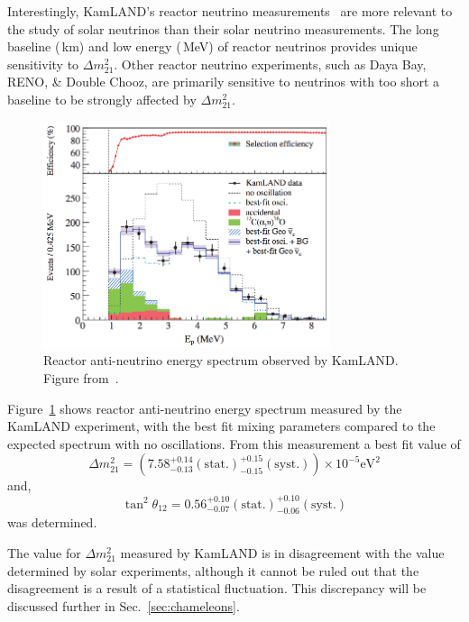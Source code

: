 Interestingly, KamLAND's reactor neutrino measurements~\citep{kamland_reactor} are
more relevant to the study of solar neutrinos than their solar neutrino measurements.
The long baseline (\,km) and low energy (\,MeV) of reactor neutrinos provides
unique sensitivity to $\Delta m^{2}_{21}$.
Other reactor neutrino experiments, such as Daya Bay, RENO, \& Double Chooz,
are primarily sensitive to neutrinos with too short a baseline to be strongly
affected by $\Delta m^{2}_{21}$.

\begin{figure}[htbp]
  \centering
  \includegraphics[width=0.75\textwidth]{kamland_reactor_spectrum}
  \caption[Kamland Reactor Spectrum]{Reactor anti-neutrino energy spectrum observed by KamLAND.
                                    Figure from~\citep{kamland_reactor}.}
  \label{fig:kamland_reactor}
\end{figure}

Figure~\ref{fig:kamland_reactor} shows reactor anti-neutrino energy spectrum measured
by the KamLAND experiment, with the best fit mixing parameters compared to the
expected spectrum with no oscillations.
From this measurement a best fit value of 
\begin{equation*}
    \Delta m^{2}_{21} = (7.58^{+0.14}_{-0.13}(\mathrm{stat.})^{+0.15}_{-0.15}(\mathrm{syst.}) )\times 10^{-5}\text{eV}^{2}
\end{equation*}
and,
\begin{equation*}
\tan^{2} \theta_{12} = 0.56^{+0.10}_{-0.07}(\mathrm{stat.})^{+0.10}_{-0.06}(\mathrm{syst.})
\end{equation*}
was determined.

The value for $\Delta m^{2}_{21}$ measured by KamLAND is in disagreement with
the value determined by solar experiments, although it cannot be ruled out that
the disagreement is a result of a statistical fluctuation. This discrepancy
will be discussed further in Sec.~\ref{sec:chameleons}.
